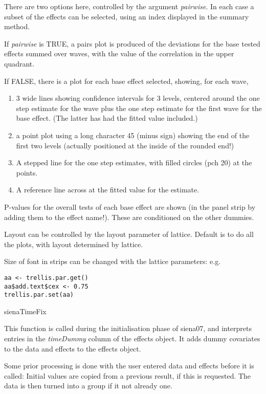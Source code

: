 \documentclass[12pt,a4paper]{article}
\makeatletter
\renewcommand{\=}{\,=\,}
\newcommand{\+}{\,+\,}
\newcommand{\nnm}[1]{\textsf{\small\textit{#1}}}
\renewcommand{\section}{\@startsection{section}{1}
                {0pt}{\baselineskip}{0.5\baselineskip}
                {\centering\sffamily} }
\makeatother
\begin{document}
There are two options here, controlled by the argument \nnm{pairwise}. In each
case a subset of the effects can be selected, using an index displayed in the
summary method.

If \nnm{pairwise} is TRUE, a pairs plot is produced of the deviations for
the base tested effects summed over waves, with the value of the correlation in
the upper quadrant.

If FALSE, there is a plot for each base effect selected, showing, for each wave,
\begin{enumerate}
\item 3 wide lines showing confidence intervals for 3 levels, centered around
  the one step estimate for the wave plus the one step estimate for the first
  wave for the base effect. (The latter has had the fitted value included.)
\item a point plot using a long character 45 (minus sign) showing the end of the
  first two levels (actually positioned at the inside of the rounded end!)
\item A stepped line for the one step estimates, with filled circles (pch 20)
at the  points.
\item A reference line across at the fitted value for the estimate.
\end{enumerate}
P-values for the overall tests of each base effect are shown (in the panel strip
by adding them to the effect name!). These are conditioned on the other dummies.

Layout can be controlled by the layout parameter of lattice. Default is to do
all the plots, with layout determined by lattice.

Size of font in strips can be changed with the lattice parameters: e.g.\
\begin{verbatim}
aa <- trellis.par.get()
aa$add.text$cex <- 0.75
trellis.par.set(aa)
\end{verbatim}
\section{sienaTimeFix}


This function is called during the initialisation phase of siena07, and
interprets entries in the \nnm{timeDummy} column of the effects object. It adds
dummy covariates to the data and effects to the effects object.

Some prior processing is done with the user entered data and effects before it
is called:  Initial values are copied from a previous result, if this is
requested.  The data is then turned into a group if it not already one.
\end{document}

